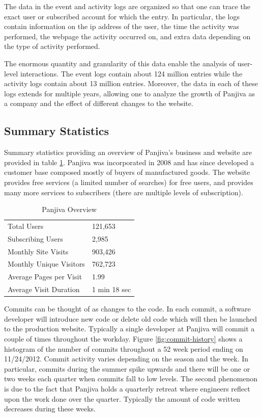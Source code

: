 \documentclass[psamsfonts]{amsart}
\begin{document}
The data in the event and activity logs are organized so that one can trace the exact user or subscribed account for which the entry. In particular, the logs contain information on the ip address of the user, the time the activity was performed, the webpage the activity occurred on, and extra data depending on the type of activity performed. 

The enormous quantity and granularity of this data enable the analysis of user-level interactions. The event logs contain about 124 million entries while the activity logs contain about 13 million entries. Moreover, the data in each of these logs extends for multiple years, allowing one to analyze the growth of Panjiva as a company and the effect of different changes to the website.

\subsection{Summary Statistics}

Summary statistics providing an overview of Panjiva's business and website are provided in table \ref{table:panjiva-overview}. Panjiva was incorporated in 2008 and has since developed a customer base composed mostly of buyers of manufactured goods. The website provides free services (a limited number of searches) for free users, and provides many more services to subscribers (there are multiple levels of subscription). 

\begin{table}[h!]
\centering
\caption{Panjiva Overview}
\begin{tabular}{l || l}
\hline
Total Users & 121,653 \\
Subscribing Users & 2,985 \\
Monthly Site Visits & 903,426 \\
Monthly Unique Visitors & 762,723 \\
Average Pages per Visit & 1.99 \\
Average Visit Duration & 1 min 18 sec \\
\hline
\end{tabular}
\label{table:panjiva-overview}
\end{table}

Commits can be thought of as changes to the code. In each commit, a software developer will introduce new code or delete old code which will then be launched to the production website. Typically a single developer at Panjiva will commit a couple of times throughout the workday. Figure \ref{fig:commit-history} shows a histogram of the number of commits throughout a 52 week period ending on 11/24/2012. Commit activity varies depending on the season and the week. In particular, commits during the summer spike upwards and there will be one or two weeks each quarter when commits fall to low levels. The second phenomenon is due to the fact that Panjiva holds a quarterly retreat where engineers reflect upon the work done over the quarter. Typically the amount of code written decreases during these weeks. 
\end{document}
